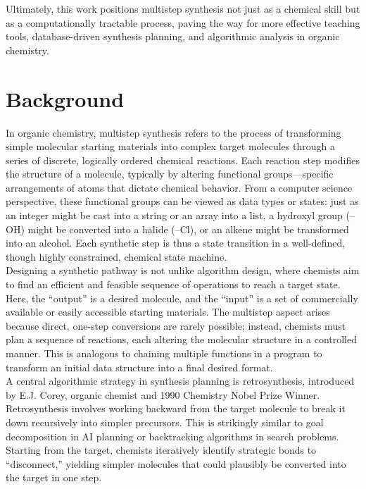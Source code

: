 \documentclass[12pt]{article}
\begin{document}
\indent
Ultimately, this work positions multistep synthesis not just as a chemical skill but as a computationally tractable process, paving the way for more effective teaching tools, database-driven synthesis planning, and algorithmic analysis in organic chemistry.
\\


\section{Background}
\indent
In organic chemistry, multistep synthesis refers to the process of transforming simple molecular starting materials into complex target molecules through a series of discrete, logically ordered chemical reactions.
Each reaction step modifies the structure of a molecule, typically by altering functional groups—specific arrangements of atoms that dictate chemical behavior.
From a computer science perspective, these functional groups can be viewed as data types or states: just as an integer might be cast into a string or an array into a list, a hydroxyl group (–OH) might be converted into a halide (–Cl), or an alkene might be transformed into an alcohol. 
Each synthetic step is thus a state transition in a well-defined, though highly constrained, chemical state machine.
\\
\indent
Designing a synthetic pathway is not unlike algorithm design, where chemists aim to find an efficient and feasible sequence of operations to reach a target state.
Here, the “output” is a desired molecule, and the “input” is a set of commercially available or easily accessible starting materials. 
The multistep aspect arises because direct, one-step conversions are rarely possible; instead, chemists must plan a sequence of reactions, each altering the molecular structure in a controlled manner.
This is analogous to chaining multiple functions in a program to transform an initial data structure into a final desired format.
\\
\indent
A central algorithmic strategy in synthesis planning is retrosynthesis, introduced by E.J. Corey, organic chemist and 1990 Chemistry Nobel Prize Winner.
Retrosynthesis involves working backward from the target molecule to break it down recursively into simpler precursors.
This is strikingly similar to goal decomposition in AI planning or backtracking algorithms in search problems.
Starting from the target, chemists iteratively identify strategic bonds to “disconnect,” yielding simpler molecules that could plausibly be converted into the target in one step.
\end{document}
